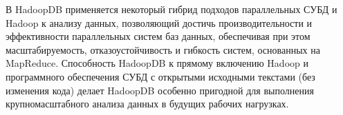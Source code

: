 В HadoopDB применяется некоторый гибрид подходов параллельных СУБД и Hadoop к анализу данных, позволяющий достичь производительности и эффективности параллельных систем баз данных, обеспечивая при этом масштабируемость, отказоустойчивость и гибкость систем, основанных на MapReduce. Способность HadoopDB к прямому включению Hadoop и программного обеспечения СУБД с открытыми исходными текстами (без изменения кода) делает HadoopDB особенно пригодной для выполнения крупномасштабного анализа данных в будущих рабочих нагрузках.